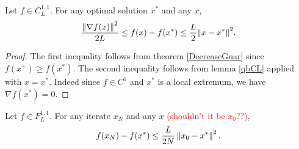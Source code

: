 \begin{lemma}
Let $f \in C_L^{1,1}$. For any optimal solution $x^*$ and any $x$,
\begin{equation*}
\frac{{\left\Vert \nabla f(x) \right\Vert}^2}{2L} \le f(x) - f(x^*) \le \frac{L}{2} {\left\Vert x-x^* \right\Vert}^2 .
\end{equation*}
\end{lemma}
\begin{proof}
The first inequality follows from theorem \ref{DecreaseGuar} since $f(x^+) \ge f(x^*)$. The second inequality follows from lemma \ref{qbCL} applied with $x = x^*$. Indeed since $f \in C^1$ and $x^*$ is a local extremum, we have $\nabla f(x^*) = 0$.
\end{proof}

\begin{theorem}
Let $f \in F_L^{1,1}$. For any iterate $x_N$ and any $x$ \textcolor{red}{(shouldn't it be $x_0$??)},
\begin{equation*}
f(x_N) - f(x^*) \le \frac{L}{2N} \left\Vert x_0-x^* \right\Vert^2 .
\end{equation*}
\end{theorem}
